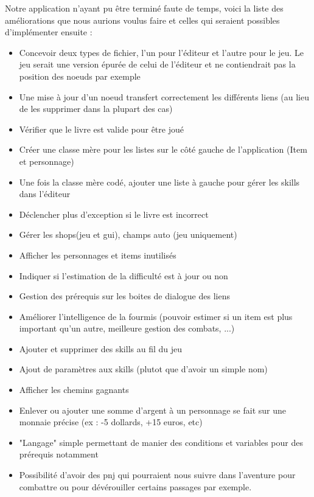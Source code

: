 		Notre application n'ayant pu être terminé faute de temps, voici la liste des améliorations que nous aurions voulus faire et celles qui seraient possibles d'implémenter ensuite :

		\begin{itemize}
			\item{Concevoir deux types de fichier, l'un pour l'éditeur et l'autre pour le jeu. Le jeu serait une version épurée de celui de l'éditeur et ne contiendrait pas la position des noeuds par exemple}
			\item{Une mise à jour d'un noeud transfert correctement les différents liens (au lieu de les supprimer dans la plupart des cas)}
			\item{Vérifier que le livre est valide pour être joué}
			\item{Créer une classe mère pour les listes sur le côté gauche de l'application (Item et personnage)}
			\item{Une fois la classe mère codé, ajouter une liste à gauche pour gérer les skills dans l'éditeur}
			\item{Déclencher plus d'exception si le livre est incorrect}
			\item{Gérer les shops(jeu et gui), champs auto (jeu uniquement)}
			\item{Afficher les personnages et items inutilisés}
			\item{Indiquer si l'estimation de la difficulté est à jour ou non}
			\item{Gestion des prérequis sur les boites de dialogue des liens}
			\item{Améliorer l'intelligence de la fourmis (pouvoir estimer si un item est plus important qu'un autre, meilleure gestion des combats, ...)}
			\item{Ajouter et supprimer des skills au fil du jeu}
			\item{Ajout de paramètres aux skills (plutot que d'avoir un simple nom)}
			\item{Afficher les chemins gagnants}
			\item{Enlever ou ajouter une somme d'argent à un personnage se fait sur une monnaie précise (ex : -5 dollards, +15 euros, etc)}
			\item{"Langage" simple permettant de manier des conditions et variables pour des prérequis notamment}
			\item{Possibilité d'avoir des pnj qui pourraient nous suivre dans l'aventure pour combattre ou pour dévérouiller certains passages par exemple.}
		\end{itemize}

